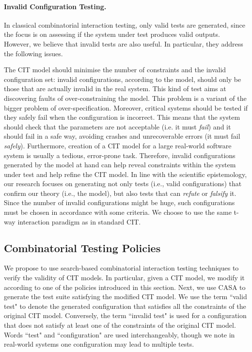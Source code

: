 \begin{tikzborder}{\cite{Gargantini16:validation}}
	\paragraph{Invalid Configuration Testing.}\label{sec:invalidimportance}
	
	\bb In classical combinatorial interaction testing, only valid tests are generated, since the focus is on assessing if the system under test produces valid outputs. 
	However, we believe that invalid tests are also useful.  In particular,  they address the following issues.
	
	The CIT model should minimise the number of constraints and the invalid configuration set:  invalid configurations, according to the model, should only be those that are actually invalid in the real system. This kind of test aims at discovering faults of over-constraining the model. This problem is a variant of the bigger problem of over-specification. Moreover, critical systems should be tested if they safely fail when the configuration is incorrect. This means that the system should check that the parameters are not acceptable (i.e. it must \emph{fail}) and it should fail in a safe way, avoiding crashes and unrecoverable errors (it must fail \emph{safely}). Furthermore, creation of a CIT model for a large real-world software system is usually a tedious, error-prone task. Therefore, invalid configurations generated by the model at hand can help reveal constraints within the system under test and help refine the CIT model. In line with the scientific epistemology, our research focuses on generating not only tests (i.e., valid configurations) that confirm our theory (i.e., the model), but also tests that can \emph{refute} or  \emph{falsify} it. 
	Since the number of invalid configurations might be huge, such configurations must be chosen in accordance with some criteria. We choose to use the same t-way interaction paradigm as in standard CIT.
	\be
	
	\subsection{Combinatorial Testing Policies}
	\label{sec:validation_citpolicies}
	
	\bb We propose to use search-based combinatorial interaction testing techniques to verify the validity of CIT models. In particular, given a CIT model, we modify it according to one of the policies introduced in this section. Next, we use CASA to generate the test suite satisfying the modified CIT model. 
	We use the term ``valid test" to denote the generated configuration that satisfies all the constraints of the original CIT model. Conversely, the term ``invalid test" is used for a configuration that does not satisfy at least one of the constraints of the original CIT model. Words ``test" and ``configuration" are used interchangeably, though we note in real-world systems one configuration may lead to multiple tests.
	\be
	

\end{tikzborder}
